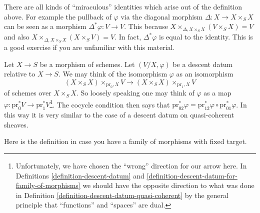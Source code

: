 \noindent
There are all kinds of ``miraculous'' identities which arise out of the
definition above. For example the pullback of $\varphi$ via the diagonal
morphism $\Delta : X \to X \times_S X$ can be seen as a morphism
$\Delta^*\varphi : V \to V$.
This because $X \times_{\Delta, X \times_S X} (V \times_S X) = V$
and also $X \times_{\Delta, X \times_S X} (X \times_S V) = V$.
In fact, $\Delta^*\varphi$ is equal to the identity.
This is a good exercise if you are unfamiliar with this material.

\begin{remark}
\label{remark-easier}
Let $X \to S$ be a morphism of schemes. Let $(V/X, \varphi)$ be
a descent datum relative to $X \to S$. We may think of the
isomorphism $\varphi$ as an isomorphism
$$
(X \times_S X) \times_{\text{pr}_0, X} V
\longrightarrow
(X \times_S X) \times_{\text{pr}_1, X} V
$$
of schemes over $X \times_S X$. So loosely speaking one may
think of $\varphi$ as a map
$\varphi : \text{pr}_0^*V \to \text{pr}_1^*V$\footnote{Unfortunately,
we have chosen the ``wrong'' direction for our arrow here. In
Definitions \ref{definition-descent-datum} and
\ref{definition-descent-datum-for-family-of-morphisms}
we should have the opposite direction to what was done in
Definition \ref{definition-descent-datum-quasi-coherent}
by the general principle that ``functions'' and ``spaces'' are dual.}.
The cocycle condition then says that
$\text{pr}_{02}^*\varphi =
\text{pr}_{12}^*\varphi \circ \text{pr}_{01}^*\varphi$.
In this way it is very similar to the case of a descent datum on
quasi-coherent sheaves.
\end{remark}

\noindent
Here is the definition in case you have a family of morphisms
with fixed target.

